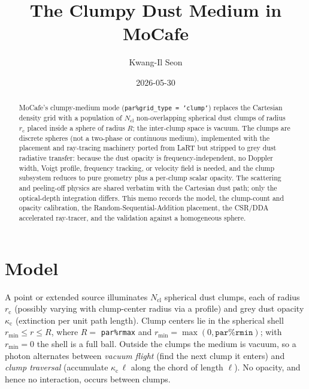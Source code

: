 \documentclass[english,a4paper]{kiseon_memo}
\newcommand{\kc}{\kappa_{\mathrm c}}
\newcommand{\rc}{r_{\mathrm c}}
\newcommand{\Ncl}{N_{\mathrm{cl}}}
\begin{document}
\title{The Clumpy Dust Medium in MoCafe}
\author{Kwang-Il Seon}
\date{2026-05-30}
\maketitle

\begin{abstract}
MoCafe's clumpy-medium mode (\texttt{par\%grid\_type = 'clump'}) replaces the
Cartesian density grid with a population of $\Ncl$ non-overlapping spherical
dust clumps of radius $\rc$ placed inside a sphere of radius $R$; the
inter-clump space is vacuum.  The clumps are discrete spheres (not a two-phase
or continuous medium), implemented with the placement and ray-tracing machinery
ported from LaRT but stripped to grey dust radiative transfer:
because the dust opacity is frequency-independent, no Doppler width, Voigt
profile, frequency tracking, or velocity field is needed, and the clump
subsystem reduces to pure geometry plus a per-clump scalar opacity.  The
scattering and peeling-off physics are shared verbatim with the Cartesian
dust path; only the optical-depth integration differs.  This memo records the
model, the clump-count and opacity calibration, the Random-Sequential-Addition
placement, the CSR/DDA accelerated ray-tracer, and the validation against a
homogeneous sphere.
\end{abstract}

\section{Model}
A point or extended source illuminates $\Ncl$ spherical dust clumps, each of
radius $\rc$ (possibly varying with clump-center radius via a profile) and grey
dust opacity $\kc$ (extinction per unit path length).  Clump centers lie in the
spherical shell $r_{\min}\le r\le R$, where $R=$ \texttt{par\%rmax} and
$r_{\min}=\max(0,\texttt{par\%rmin})$; with $r_{\min}=0$ the shell is a full
ball.  Outside the clumps the medium is vacuum, so a photon alternates between
\emph{vacuum flight} (find the next clump it enters) and \emph{clump traversal}
(accumulate $\kc\,\ell$ along the chord of length $\ell$).  No opacity, and
hence no interaction, occurs between clumps.
\end{document}
